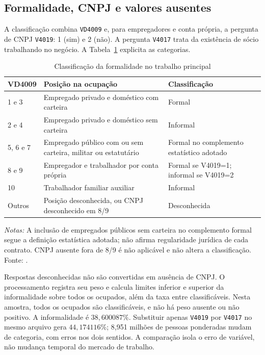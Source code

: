 \subsection{Formalidade, CNPJ e valores ausentes}
A classificação combina \texttt{VD4009} e, para empregadores e conta própria, a pergunta de CNPJ \texttt{V4019}: 1 (sim) e 2 (não). A pergunta \texttt{V4017} trata da existência de sócio trabalhando no negócio. A Tabela~\ref{tab:app_classification} explicita as categorias.
\begin{table}[htbp]
\centering
\caption{Classificação da formalidade no trabalho principal}
\label{tab:app_classification}
\normalsize
\begin{tabular}{@{}p{1.6cm}p{7.1cm}p{4.8cm}@{}}
\toprule
VD4009 & Posição na ocupação & Classificação \\
\midrule
1 e 3 & Empregado privado e doméstico com carteira & Formal \\
2 e 4 & Empregado privado e doméstico sem carteira & Informal \\
5, 6 e 7 & Empregado público com ou sem carteira, militar ou estatutário & Formal no complemento estatístico adotado \\
8 e 9 & Empregador e trabalhador por conta própria & Formal se V4019=1; informal se V4019=2 \\
10 & Trabalhador familiar auxiliar & Informal \\
Outros & Posição desconhecida, ou CNPJ desconhecido em 8/9 & Desconhecida \\
\bottomrule
\end{tabular}
\begin{minipage}{0.98\textwidth}\normalsize
\textit{Notas:} A inclusão de empregados públicos sem carteira no complemento formal segue a definição estatística adotada; não afirma regularidade jurídica de cada contrato. CNPJ ausente fora de 8/9 é não aplicável e não altera a classificação. Fonte: \citet{PNADDicionario2022}.
\end{minipage}
\end{table}

Respostas desconhecidas não são convertidas em ausência de CNPJ. O processamento registra seu peso e calcula limites inferior e superior da informalidade sobre todos os ocupados, além da taxa entre classificáveis. Nesta amostra, todos os ocupados são classificáveis, e não há peso ausente ou não positivo. A informalidade é $38{,}600087\%$. Substituir apenas \texttt{V4019} por \texttt{V4017} no mesmo arquivo gera $44{,}174116\%$; 8,951 milhões de pessoas ponderadas mudam de categoria, com erros nos dois sentidos. A comparação isola o erro de variável, não mudança temporal do mercado de trabalho.

